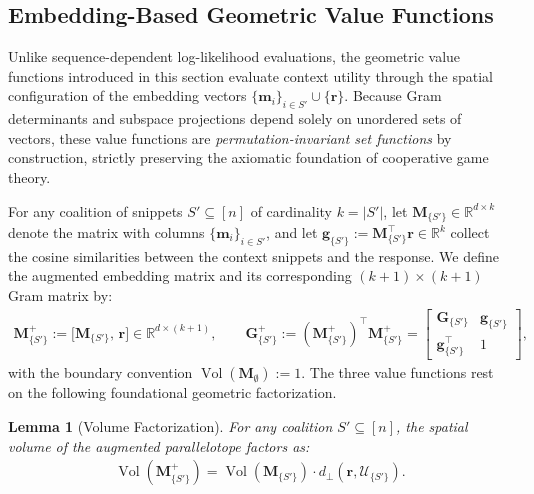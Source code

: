\documentclass{article}
\newtheorem{lemma}[theorem]{Lemma}
\begin{document}
\subsection{Embedding-Based Geometric Value Functions}
\label{subsec:geometric_values}

Unlike sequence-dependent log-likelihood evaluations, the geometric value functions introduced in this section evaluate context utility through the spatial configuration of the embedding vectors $\{\mathbf{m}_i\}_{i \in S'} \cup \{\mathbf{r}\}$. Because Gram determinants and subspace projections depend solely on unordered sets of vectors, these value functions are \emph{permutation-invariant set functions} by construction, strictly preserving the axiomatic foundation of cooperative game theory.

For any coalition of snippets $S' \subseteq [n]$ of cardinality $k = |S'|$, let $\mathbf{M}_{\{S'\}} \in \mathbb{R}^{d \times k}$ denote the matrix with columns $\{\mathbf{m}_i\}_{i \in S'}$, and let $\mathbf{g}_{\{S'\}} := \mathbf{M}_{\{S'\}}^\top \mathbf{r} \in \mathbb{R}^k$ collect the cosine similarities between the context snippets and the response. We define the augmented embedding matrix and its corresponding $(k+1) \times (k+1)$ Gram matrix by:
\begin{align}
    \mathbf{M}^{+}_{\{S'\}} := \big[\mathbf{M}_{\{S'\}}, \, \mathbf{r}\big] \in \mathbb{R}^{d \times (k+1)}, \qquad
    \mathbf{G}^{+}_{\{S'\}} := (\mathbf{M}^{+}_{\{S'\}})^\top \mathbf{M}^{+}_{\{S'\}} =
    \begin{bmatrix} 
        \mathbf{G}_{\{S'\}} & \mathbf{g}_{\{S'\}} \\ 
        \mathbf{g}_{\{S'\}}^\top & 1 
    \end{bmatrix},
\end{align}
with the boundary convention $\operatorname{Vol}(\mathbf{M}_{\emptyset}) := 1$. The three value functions rest on the following foundational geometric factorization.

\begin{lemma}[Volume Factorization]\label{lem:vol_factorization}
For any coalition $S' \subseteq [n]$, the spatial volume of the augmented parallelotope factors as:
\begin{align}
    \operatorname{Vol}(\mathbf{M}^{+}_{\{S'\}}) = \operatorname{Vol}(\mathbf{M}_{\{S'\}}) \cdot d_{\perp}(\mathbf{r}, \mathcal{U}_{\{S'\}}).
\end{align}
\end{lemma}
\end{document}
